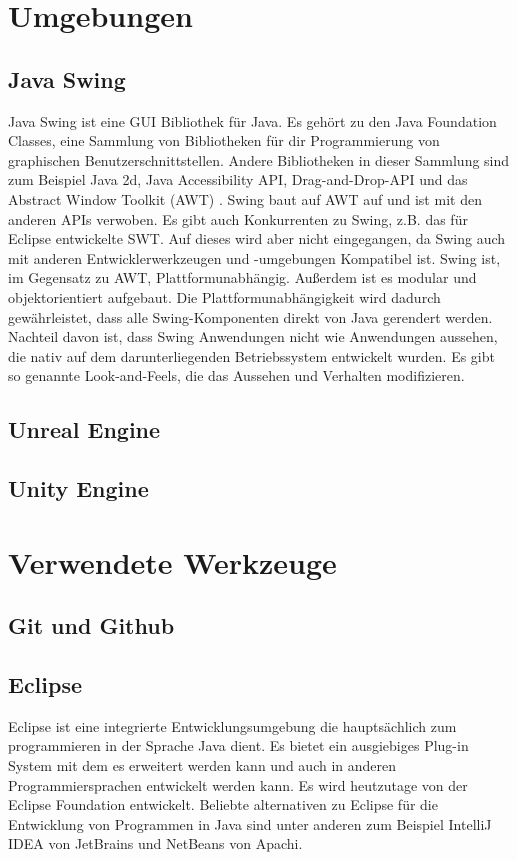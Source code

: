 \documentclass[
	12pt, %
	a4paper,
	listof=totoc, %
	bibliography=totoc, %
	numbers=noenddot, %
	ngerman, %
	headsepline, %
	oneside %
	]{scrbook} %
\begin{document}
\chapter{Umgebungen}\label{sec:Umgebungen}
\section{Java Swing}
Java Swing ist eine \gls{GUI} Bibliothek für Java. Es gehört zu den Java Foundation Classes, eine Sammlung von Bibliotheken für dir Programmierung von graphischen Benutzerschnittstellen. Andere Bibliotheken in dieser Sammlung sind zum Beispiel Java 2d, Java Accessibility API, Drag-and-Drop-API und das Abstract Window Toolkit (AWT) \cite{JFC}. Swing baut auf AWT auf und ist mit den anderen APIs verwoben.  
Es gibt auch Konkurrenten zu Swing, z.B. das für Eclipse entwickelte SWT. Auf dieses wird aber nicht eingegangen, da Swing auch mit anderen Entwicklerwerkzeugen und -umgebungen Kompatibel ist.  
Swing ist, im Gegensatz zu AWT, Plattformunabhängig. Außerdem ist es modular und objektorientiert aufgebaut. Die Plattformunabhängigkeit wird dadurch gewährleistet, dass alle Swing-Komponenten direkt von Java gerendert werden. Nachteil davon ist, dass Swing Anwendungen nicht wie Anwendungen aussehen, die nativ auf dem darunterliegenden Betriebssystem entwickelt wurden.  
Es gibt so genannte \glqq Look-and-Feels\grqq{}, die das Aussehen und Verhalten modifizieren.

\section{Unreal Engine}
\section{Unity Engine}


\chapter{Verwendete Werkzeuge}
\section{Git und Github}
\section{Eclipse}
Eclipse ist eine integrierte Entwicklungsumgebung die hauptsächlich zum programmieren in der Sprache Java dient. Es bietet ein ausgiebiges Plug-in System mit dem es erweitert werden kann und auch in anderen Programmiersprachen entwickelt werden kann.
Es wird heutzutage von der Eclipse Foundation entwickelt. Beliebte alternativen zu Eclipse für die Entwicklung von Programmen in Java sind unter anderen zum Beispiel IntelliJ IDEA von JetBrains und NetBeans von Apachi.
\end{document}

